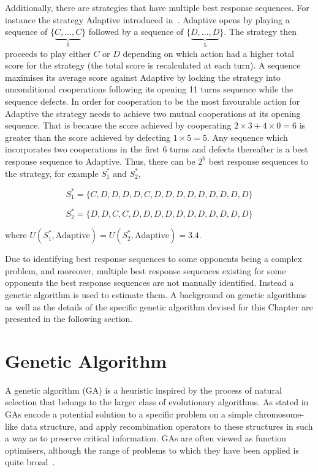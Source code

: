 Additionally, there are strategies that have multiple best response sequences. For
instance the strategy Adaptive introduced in~\cite{Li2011}. Adaptive opens by
playing a sequence of \(\{\underbrace{C, \dots, C}_{6}\}\) followed by a
sequence of \(\{\underbrace{D, \dots, D}_{5}\}\). The strategy then proceeds to
play either \(C\) or \(D\) depending on which action had a higher total score
for the strategy (the total score is recalculated at each turn). A sequence
maximises its average score against Adaptive by locking the strategy into
unconditional cooperations following its opening 11 turns sequence while the sequence
defects. In order
for cooperation to be the most favourable action for Adaptive the strategy needs to achieve
two mutual cooperations at its opening sequence. That is because the score achieved
by cooperating \(2 \times 3 + 4 \times 0 = 6\) is greater than the
score achieved by defecting \(1 \times 5 = 5\).
Any sequence which incorporates two cooperations in the first 6 turns
and defects thereafter is a best response sequence to Adaptive. Thus, there
can be \(2^{6}\) best response sequences to the strategy, for example \(S_{1}^*\) and \(S_{2}^*\),

\[S_{1}^* = \{C, D, D, D, D, C, D, D, D, D, D, D, D, D, D\}\]

\[S_{2}^* = \{D, D, C, C, D, D, D, D, D, D, D, D, D, D, D\}\]

where \(U(S_{1}^*, \text{Adaptive}) = U(S_{2}^*, \text{Adaptive}) = 3.4\).

Due to identifying best response sequences to some opponents being a complex
problem, and moreover, multiple best response sequences existing for some
opponents the best response sequences are not manually identified. Instead a
genetic algorithm is used to estimate them. A background on genetic algorithms
as well as the details of the specific genetic algorithm devised for this Chapter
are presented in the following section.

\section{Genetic Algorithm}\label{section:genetic_algorithm}

A genetic algorithm (GA) is a heuristic inspired by the process of natural
selection that belongs to the larger class of evolutionary algorithms. As stated
in~\cite{Whitley1994} GAs encode a potential solution to a
specific problem on a simple chromosome-like data structure, and apply
recombination operators to these structures in such a way as to preserve
critical information. GAs are often viewed as function
optimisers, although the range of problems to which they have been
applied is quite broad~\cite{Hou1994, Jones1997, Yang1998}.

